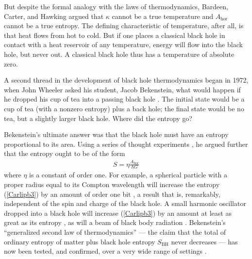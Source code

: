 \documentclass[11pt]{article}
\makeatletter
\def\section{\@startsection{section}{1}{\z@}{3.5ex plus 1ex minus
   .2ex}{2.3ex plus .2ex}{\large\bf}}
\makeatother
\begin{document}
But despite the formal analogy with the laws of thermodynamics, 
Bardeen, Carter, and Hawking argued that $\kappa$ cannot be a true
temperature and $A_{\mathrm{\scriptstyle hor}}$ cannot be a
 true entropy.  The defining characteristic
of temperature, after all, is that heat flows from hot to cold.  But if
one places a classical black hole in contact with a heat reservoir
of any temperature, energy will flow into the black hole, but never 
out.  A classical black hole thus has a temperature of absolute zero.

A second thread in the development of black hole thermodynamics began
in 1972, when John Wheeler asked his student, Jacob Bekenstein, what
would happen if he dropped his cup of tea into a passing black hole
\cite{Wheeler}.  The initial state would be a cup of tea (with a nonzero 
entropy) plus a back hole; the final state would be no tea, but a slightly 
larger black hole.  Where did the entropy go?

Bekenstein's ultimate answer was that the black hole must have an entropy
proportional to its area.  Using a series of thought experiments
\cite{Bekb,Bekenstein},  he argued further that the entropy
ought to be of the form 
\begin{align}
S = \eta \frac{A_{\mathrm{\scriptstyle hor}}}{\hbar G} 
\label{Carlipb3}
\end{align}
where $\eta$ is a constant of order one.  For example, a spherical particle 
with a proper radius equal to its Compton wavelength will increase the
entropy (\ref{Carlipb3}) by an amount of order one bit \cite{Bekenstein},
a result that is, remarkably, independent of the spin and charge of the 
black hole.  A small harmonic oscillator dropped into a black hole will 
increase (\ref{Carlipb3}) by an amount at least as great as its entropy
\cite{Bekenstein}, as will a beam of black body radiation \cite{Bekb}.
Bekenstein's ``generalized second law of thermodynamics'' --- the
claim that the total of ordinary entropy of matter plus black hole
entropy $S_{\scriptscriptstyle\mathrm{BH}}$ never decreases --- has
now been tested, and confirmed, over a very wide range of settings
\cite{Wall,Waldb,Wallx}.

\section{ Hawking radiation \label{HR}}
\end{document}
